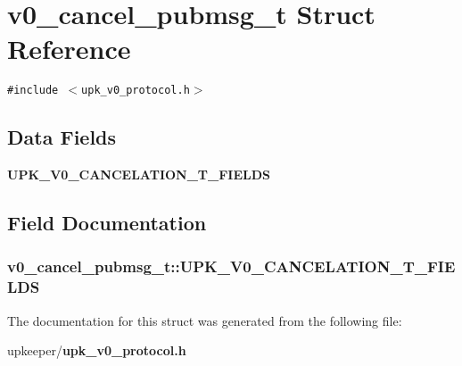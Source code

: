 \section{v0\_\-cancel\_\-pubmsg\_\-t Struct Reference}
\label{structv0__cancel__pubmsg__t}
{\tt \#include $<$upk\_\-v0\_\-protocol.h$>$}

\subsection*{Data Fields}
\begin{CompactItemize}
\item 
\bf{UPK\_\-V0\_\-CANCELATION\_\-T\_\-FIELDS}
\end{CompactItemize}


\subsection{Field Documentation}
\subsubsection{\setlength{\rightskip}{0pt plus 5cm}\bf{v0\_\-cancel\_\-pubmsg\_\-t::UPK\_\-V0\_\-CANCELATION\_\-T\_\-FIELDS}}\label{structv0__cancel__pubmsg__t_f993cb3c34a21a947d702cb15c4647ac}




The documentation for this struct was generated from the following file:\begin{CompactItemize}
\item 
upkeeper/\bf{upk\_\-v0\_\-protocol.h}\end{CompactItemize}
